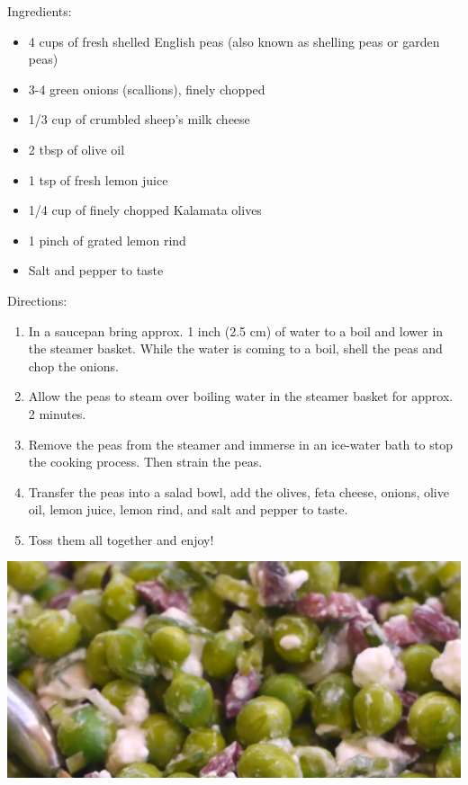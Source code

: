 \documentclass{article}
\begin{document}
%
%
%
%
%

\begin{multicols}{2}
Ingredients:
\begin{itemize}
\item 4 cups of fresh shelled English peas (also known as shelling peas or garden peas)
\item 3-4 green onions (scallions), finely chopped
\item 1/3 cup of crumbled sheep's milk cheese
\item 2 tbsp of olive oil
\item 1 tsp of fresh lemon juice
\item 1/4 cup of finely chopped Kalamata olives
\item 1 pinch of grated lemon rind
\item Salt and pepper to taste
\end{itemize}

\columnbreak

Directions:
\begin{enumerate}
\item In a saucepan bring approx. 1 inch (2.5 cm) of water to a boil and lower in the steamer basket. While the water is coming to a boil, shell the peas and chop the onions.

\item Allow the peas to steam over boiling water in the steamer basket for approx. 2 minutes.

\item Remove the peas from the steamer and immerse in an ice-water bath to stop the cooking process. Then strain the peas.

\item Transfer the peas into a salad bowl, add the olives, feta cheese, onions, olive oil, lemon juice, lemon rind, and salt and pepper to taste.

\item Toss them all together and enjoy!

\end{enumerate}
\end{multicols}



\begin{center}
\includegraphics[scale=0.4]{SweetPeaSalad.png}
\end{center}
\end{document}
